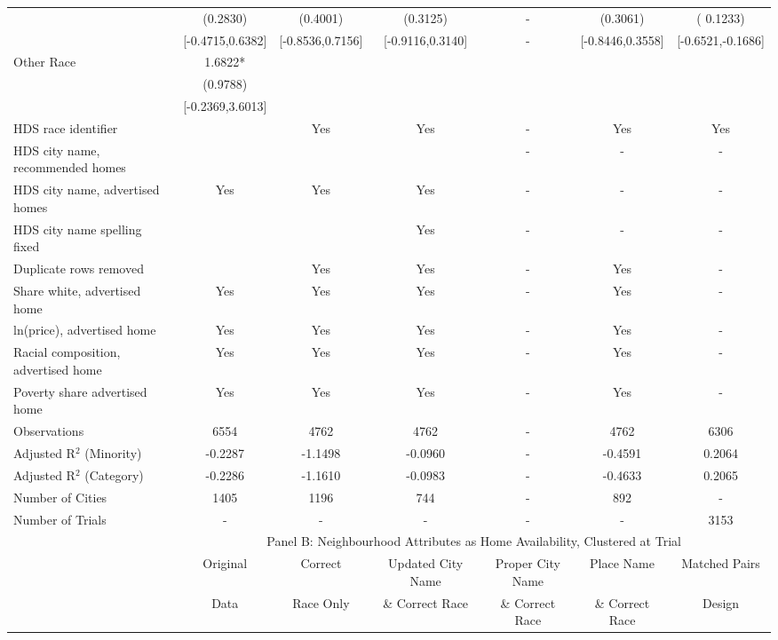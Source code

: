 \begin{table}[htbp]
{\begin{tabular}{l*{6}{c}}
 & (0.2830) & (0.4001) & (0.3125) & - & (0.3061) & ( 0.1233) \\
 & [-0.4715,0.6382] & [-0.8536,0.7156] & [-0.9116,0.3140] & - & [-0.8446,0.3558] & [-0.6521,-0.1686] \\
Other Race & 1.6822* &  &  &  &  &  \\
 & (0.9788) &  &  &  &  &  \\
 & [-0.2369,3.6013] &  &  &  &  &  \\
\midrule
HDS race identifier & & Yes & Yes & - & Yes & Yes \\
HDS city name, recommended homes &  &  & &- & - & -\\
HDS city name, advertised homes & Yes & Yes & Yes & - & - & -\\
HDS city name spelling fixed & & & Yes & - & - & -\\
Duplicate rows removed &  & Yes & Yes & - & Yes & - \\
\midrule
Share white, advertised home  & Yes & Yes & Yes & - & Yes & - \\
ln(price), advertised home  & Yes & Yes & Yes & - & Yes & - \\
Racial composition, advertised home & Yes & Yes & Yes & - & Yes & - \\
Poverty share advertised home & Yes & Yes & Yes & - & Yes & - \\
Observations & 6554 & 4762 & 4762 & - & 4762 & 6306 \\
Adjusted R$^2$ (Minority) & -0.2287 & -1.1498 & -0.0960 & - & -0.4591 & 0.2064 \\
Adjusted R$^2$ (Category) & -0.2286 & -1.1610 & -0.0983 & - & -0.4633 & 0.2065 \\
Number of Cities & 1405 & 1196 & 744 & - & 892 & - \\
Number of Trials & - & - & - & - & - & 3153 \\
\bottomrule
\toprule
& \multicolumn{6}{c}{Panel B: Neighbourhood Attributes as Home Availability, Clustered at Trial}\\
\toprule
                    &\multicolumn{1}{c}{Original}&\multicolumn{1}{c}{Correct}&\multicolumn{1}{c}{Updated City Name}&\multicolumn{1}{c}{Proper City Name}&\multicolumn{1}{c}{Place Name}&\multicolumn{1}{c}{Matched Pairs}\\
                      &\multicolumn{1}{c}{Data}&\multicolumn{1}{c}{Race Only}&\multicolumn{1}{c}{\& Correct Race}&\multicolumn{1}{c}{\& Correct Race}&\multicolumn{1}{c}{\& Correct Race}&\multicolumn{1}{c}{Design}\\                  

\end{tabular}}
\end{table}
